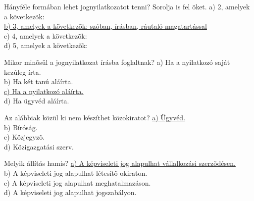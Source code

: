 \begin{frame}

\begin{tcolorbox}[title={141. Kérdés}]
Hányféle formában lehet jognyilatkozatot tenni? Sorolja is fel õket.
\tcblower
a) 2, amelyek a következõk:\\
\uline {b) 3, amelyek a következõk: szóban, írásban, ráutaló magatartással}\\
c) 4, amelyek a következõk:\\
d) 5, amelyek a következõk:
\end{tcolorbox}

\begin{tcolorbox}[title={142. Kérdés}]
Mikor minõsül a jognyilatkozat írásba foglaltnak?
\tcblower
a) Ha a nyilatkozó saját kezûleg írta.\\
b) Ha két tanú aláírta.\\
\uline {c) Ha a nyilatkozó aláírta.}\\
d) Ha ügyvéd aláírta.
\end{tcolorbox}

\begin{tcolorbox}[title={143. Kérdés}]
Az alábbiak közül ki nem készíthet közokiratot?
\tcblower
\uline {a) Ügyvéd.}\\
b) Bíróság.\\
c) Közjegyzõ.\\
d) Közigazgatási szerv.
\end{tcolorbox}

\begin{tcolorbox}[title={144. Kérdés}]
Melyik állítás hamis?
\tcblower
\uline {a) A képviseleti jog alapulhat vállalkozási szerzõdésen.}\\
b) A képviseleti jog alapulhat létesítõ okiraton.\\
c) A képviseleti jog alapulhat meghatalmazáson.\\
d) A képviseleti jog alapulhat jogszabályon. 
\end{tcolorbox}

\end{frame}


